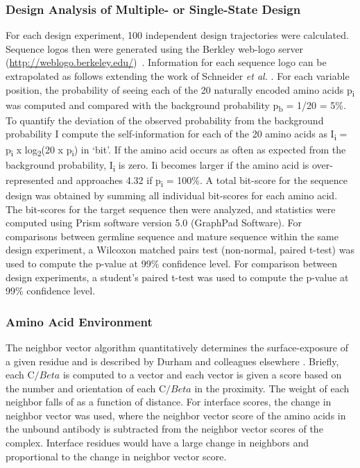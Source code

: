 \subsubsection{Design Analysis of Multiple- or Single-State Design}
For each design experiment, 100 independent design trajectories were calculated. Sequence logos then were generated using the Berkley web-logo server (\url{http://weblogo.berkeley.edu/})~\citep{Crooks:2004do}. Information for each sequence logo can be extrapolated as follows extending the work of Schneider \textit{et al.} \citep{Schneider:1990ub}. For each variable position, the probability of seeing each of the 20 naturally encoded amino acids p\textsubscript{i} was computed and compared with the background probability p\textsubscript{b} = 1/20 = 5\%. To quantify the deviation of the observed probability from the background probability I compute the self-information for each of the 20 amino acids as I\textsubscript{i} = p\textsubscript{i} x log\textsubscript{2}(20 x p\textsubscript{i}) in `bit'. If the amino acid occurs as often as expected from the background probability, I\textsubscript{i} is zero. Ii becomes larger if the amino acid is over-represented and approaches 4.32 if p\textsubscript{i} = 100\%. A total bit-score for the sequence design was obtained by summing all individual bit-scores for each amino acid. The bit-scores for the target sequence then were analyzed, and statistics were computed using Prism software version 5.0 (GraphPad Software).  For comparisons between germline sequence and mature sequence within the same design experiment, a Wilcoxon matched pairs test (non-normal, paired t-test) was used to compute the p-value at 99\% confidence level. For comparison between design experiments, a student's paired t-test was used to compute the p-value at 99\% confidence level.

\subsubsection{Amino Acid Environment}
The neighbor vector algorithm quantitatively determines the surface-exposure of a given residue and is described by Durham and colleagues elsewhere \citep{Durham:2009kt}. Briefly, each C$/Beta$ is computed to a vector and each vector is given a score based on the number and orientation of each C$/Beta$ in the proximity. The weight of each neighbor falls of as a function of distance.
For interface scores, the change in neighbor vector was used, where the neighbor vector score of the amino acids in the unbound antibody is subtracted from the neighbor vector scores of the complex. Interface residues would have a large change in neighbors and proportional to the change in neighbor vector score.

